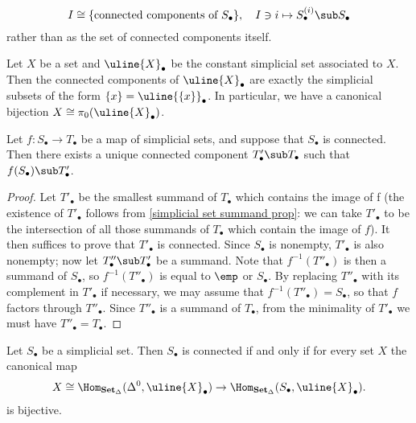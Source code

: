\[I\cong\{\text{connected components of $S_\bullet$}\},\quad I\ni i\mapsto S^{(i)}_\bullet\sub S_\bullet\]
rather than as the set of connected components itself.
\begin{example}\label{simplicial set constant pi_0 char}
Let $X$ be a set and $\uline{X}_\bullet$ be the constant simplicial set associated to $X$. Then the connected components of $\uline{X}_\bullet$ are exactly the simplicial subsets of the form $\{x\}=\uline{\{x\}}_\bullet$. In particular, we have a canonical bijection $X\cong\pi_0(\uline{X}_\bullet)$.
\end{example}
\begin{proposition}\label{simplicial set connected image is connected}
Let $f:S_\bullet\to T_\bullet$ be a map of simplicial sets, and suppose that $S_\bullet$ is connected. Then there exists a unique connected component $T'_\bullet\sub T_\bullet$ such that $f(S_\bullet)\sub T'_\bullet$.
\end{proposition}
\begin{proof}
Let $T'_\bullet$ be the smallest summand of $T_\bullet$ which contains the image of f (the existence of $T'_\bullet$ follows from \cref{simplicial set summand prop}: we can take $T'_\bullet$ to be the intersection of all those summands of $T_\bullet$ which contain the image of $f$). It then suffices to prove that $T'_\bullet$ is connected. Since $S_\bullet$ is nonempty, $T'_\bullet$ is also nonempty; now let $T''_\bullet\sub T'_\bullet$ be a summand. Note that $f^{-1}(T''_\bullet)$ is then a summand of $S_\bullet$, so $f^{-1}(T''_\bullet)$ is equal to $\emp$ or $S_\bullet$. By replacing $T''_\bullet$ with its complement in $T'_\bullet$ if necessary, we may assume that $f^{-1}(T''_\bullet)=S_\bullet$, so that $f$ factors through $T''_\bullet$. Since $T''_\bullet$ is a summand of $T_\bullet$, from the minimality of $T'_\bullet$ we must have $T''_\bullet=T_\bullet$.
\end{proof}
\begin{corollary}\label{simplicial set connected iff to constant}
Let $S_\bullet$ be a simplicial set. Then $S_\bullet$ is connected if and only if for every set $X$ the canonical map
\begin{align}\label{simplicial set connected iff to constant-1}
X\cong\Hom_{\mathbf{Set}_\Delta}(\Delta^0,\uline{X}_\bullet)\to\Hom_{\mathbf{Set}_\Delta}(S_\bullet,\uline{X}_\bullet).
\end{align}
is bijective.
\end{corollary}
